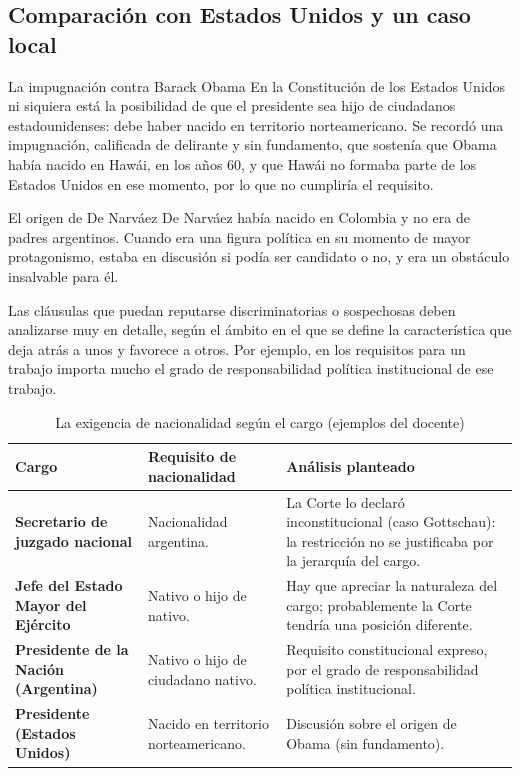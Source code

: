 \documentclass[12pt,oneside]{book}
\begin{document}
\subsection{Comparación con Estados Unidos y un caso local}

\begin{example}{La impugnación contra Barack Obama}
En la Constitución de los Estados Unidos ni siquiera está la posibilidad de que el presidente sea hijo de ciudadanos estadounidenses: debe haber nacido en territorio norteamericano. Se recordó una impugnación, calificada de delirante y sin fundamento, que sostenía que Obama había nacido en Hawái, en los años 60, y que Hawái no formaba parte de los Estados Unidos en ese momento, por lo que no cumpliría el requisito.
\end{example}


\begin{example}{El origen de De Narváez}
De Narváez había nacido en Colombia y no era de padres argentinos. Cuando era una figura política en su momento de mayor protagonismo, estaba en discusión si podía ser candidato o no, y era un obstáculo insalvable para él.
\end{example}

Las cláusulas que puedan reputarse discriminatorias o sospechosas deben analizarse muy en detalle, según el ámbito en el que se define la característica que deja atrás a unos y favorece a otros. Por ejemplo, en los requisitos para un trabajo importa mucho el grado de responsabilidad política institucional de ese trabajo.

\begin{table}[H]
\centering
\caption{La exigencia de nacionalidad según el cargo (ejemplos del docente)}
\small
\begin{tabularx}{\textwidth}{
    >{\raggedright\arraybackslash}p{}
    >{\raggedright\arraybackslash}p{}
    >{\raggedright\arraybackslash}X
}
\toprule
\textbf{Cargo} & \textbf{Requisito de nacionalidad} & \textbf{Análisis planteado} \\
\midrule
\textbf{Secretario de juzgado nacional} & Nacionalidad argentina. & La Corte lo declaró inconstitucional (caso Gottschau): la restricción no se justificaba por la jerarquía del cargo. \\
\textbf{Jefe del Estado Mayor del Ejército} & Nativo o hijo de nativo. & Hay que apreciar la naturaleza del cargo; probablemente la Corte tendría una posición diferente. \\
\textbf{Presidente de la Nación (Argentina)} & Nativo o hijo de ciudadano nativo. & Requisito constitucional expreso, por el grado de responsabilidad política institucional. \\
\textbf{Presidente (Estados Unidos)} & Nacido en territorio norteamericano. & Discusión sobre el origen de Obama (sin fundamento). \\
\bottomrule
\end{tabularx}
\end{table}
\end{document}
